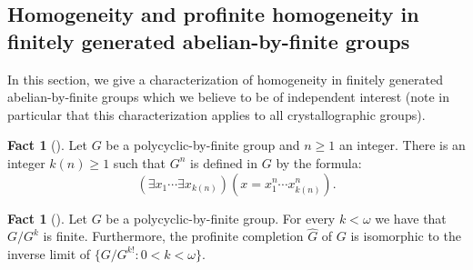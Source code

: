\documentclass[a4paper, 11pt]{amsart}
\newtheorem{lemme}[te]{Lemma}
\theoremstyle{definition}
\newtheorem{fact}[te]{Fact}
\newtheorem{notation}[te]{Notation}
\theoremstyle{remark}
\renewcommand{\leq}{\leqslant}
\renewcommand{\geq}{\geqslant}
\begin{document}
\subsection{Homogeneity and profinite homogeneity in finitely generated abelian-by-finite groups}

In this section, we give a characterization of homogeneity in finitely generated abelian-by-finite groups which we believe to be of independent interest (note in particular that this characterization applies to all crystallographic groups).




\begin{fact}[{\cite[Prop~0.1]{Oger1984}}]\label{oger_fact}
Let $G$ be a polycyclic-by-finite group and $n \geq 1$ an integer. There is an integer $k(n) \geq 1$ such that $G^n$ is defined in $G$ by the formula:
\[(\exists x_1 \cdots \exists x_{k(n)})(x = x_1^n \cdots x_{k(n)}^n).\]
\end{fact}

\begin{fact}[{\cite{grune_annals_1980}}]\label{grune_fact} Let $G$ be a polycyclic-by-finite group. For every $k < \omega$ we have that $G/G^k$ is finite. Furthermore, the profinite completion $\widehat{G}$ of $G$ is isomorphic to the inverse limit of $\{G/G^{k!} : 0 < k < \omega \}$.
\end{fact}
\end{document}
